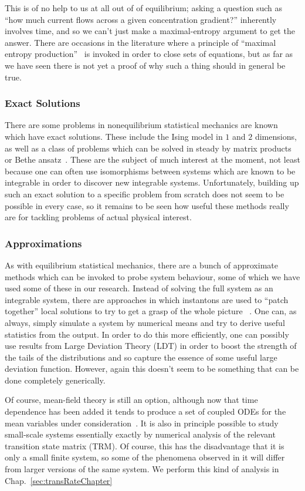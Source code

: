 This is of no help to us at all out of of equilibrium; asking a question such as
``how much current flows across a given concentration gradient?'' inherently involves time, and so
we can't just make a maximal-entropy argument to get the answer. There are occasions in the 
literature where a principle of ``maximal entropy production''~\cite{dewar2005, martyushev2006}
is invoked in order to close sets of
equations, but as far as we have seen there is not yet a proof of why such a thing should in
general be true.


\subsubsection{Exact Solutions}
There are some problems in nonequilibrium statistical mechanics are known which have exact solutions. 
These include the Ising model in $1$ and $2$ dimensions, as well as a class of problems which can be
solved in steady by matrix products or Bethe ansatz~\cite{van2016}. These are the subject of much
interest at the
moment, not least because one can often use isomorphisms between systems which are known to
be integrable in order to discover new integrable systems. Unfortunately, building up such an exact solution to a specific problem from scratch does not seem to be possible in every case,
so it remains to be seen how useful these methods really are for tackling problems of actual
physical interest.


\subsubsection{Approximations}
As with equilibrium statistical mechanics, there are a bunch of approximate methods which can
be invoked to probe system behaviour, some of which we have used some of these in our research.
Instead of solving the full system as an integrable system, there are approaches in which instantons
are used to ``patch together'' local solutions to try to get a grasp of the whole picture
~\cite{wallace1978}. One can,
as always, simply simulate a system by numerical means and try to derive useful statistics from the
output. In order to do this more efficiently, one can possibly use results from Large Deviation
Theory (LDT) in order to boost the strength of the tails of the distributions and so capture the essence
of some useful large deviation function. However, again this doesn't seem to be something that can
be done completely generically.

Of course, mean-field theory is still an option, although now that time dependence has been added
it tends to produce a set of coupled ODEs for the mean variables under consideration~\cite{Kolesnichenko2014}. It is also in
principle possible to study small-scale systems essentially exactly by numerical analysis of the
relevant transition state matrix (TRM). Of course, this has the disadvantage that it is only a
small finite system, so some of the phenomena observed in it will differ from larger versions of the
same system. We perform this kind of analysis in Chap.~\ref{sec:transRateChapter}


